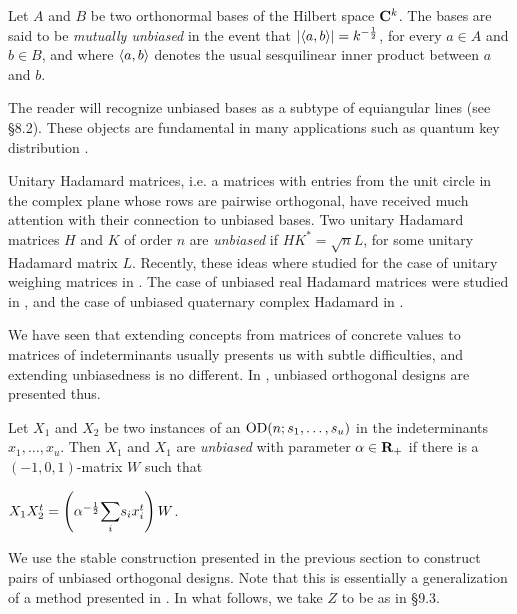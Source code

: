 \documentclass[../../../main]{subfiles}
\begin{document}
Let $A$ and $B$ be two orthonormal bases of the Hilbert space $\mathbf{C}^k$. The bases are said to be {\it mutually unbiased} in the event that $|\langle a,b\rangle|=k^{-\frac{1}{2}}$, for every $a \in A$ and $b \in B$, and where $\langle a,b\rangle$ denotes the usual sesquilinear inner product between $a$ and $b$.

The reader will recognize unbiased bases as a subtype of equiangular lines (see \S8.2). These objects are fundamental in many applications such as quantum key distribution \cite[see][]{real-unbiased-bases}.

Unitary Hadamard matrices, i.e. a matrices with entries from the unit circle in
the complex plane whose rows are pairwise orthogonal, have received much
attention with their connection to unbiased bases. Two unitary Hadamard matrices
$H$ and $K$ of order $n$ are {\it unbiased} if
$HK^*=\sqrt{n}L$, for some unitary Hadamard matrix $L$. Recently, these ideas
where studied for the case of unitary weighing matrices  in \cite{unbiased-weighing}. The case of unbiased real Hadamard matrices were studied in \cite{unbiased-real}, and the case of unbiased quaternary complex Hadamard in \cite{unbiased-complex}.

We have seen that extending concepts from matrices of concrete values to matrices of indeterminants usually presents us with subtle difficulties, and extending unbiasedness is no different. In \cite{unbiased-od}, unbiased orthogonal designs are presented thus.

\begin{defin}
 Let $X_1$ and $X_2$ be two instances of an $\text{OD}(n;s_1,\dots,s_u)$ in the indeterminants $x_1,\dots,x_u$. Then $X_1$ and $X_1$ are {\it unbiased} with parameter $\alpha \in \mathbf{R}_+$ if there is a $(-1,0,1)$-matrix $W$ such that
 \begin{defenum}
  \item $X_1X_2^t = \left(\alpha^{-\frac{1}{2}}\ssum_i s_ix_i^t\right)W$.
 \end{defenum}
\end{defin}

We use the stable construction presented in the previous section to construct pairs of unbiased orthogonal designs. Note that this is essentially a generalization of a method presented in \cite{splittable-hadamard}. In what follows, we take $Z$ to be as in \S9.3.
\end{document}
